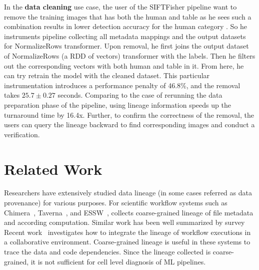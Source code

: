 \documentclass{sig-alternate}
\begin{document}
In the {\bf data cleaning} use case, the user of the SIFTFisher pipeline want to remove the training images that has both the human and table as
he sees such a combination results in lower detection accuracy for the human category .
So he instruments pipeline collecting all metadata mappings and the output datasets for NormalizeRows transformer. 
Upon removal, he first joins the output dataset of NormalizeRows (a RDD of vectors) transformer with the labels.
Then he filters out the corresponding vectors with both human and table in it. 
From here, he can try retrain the model with the cleaned dataset. 
This particular instrumentation introduces a performance penalty of 46.8\%, and the removal takes $25.7\pm0.27$ seconds.
Comparing to the case of rerunning the data preparation phase of the pipeline, using lineage information speeds up the turnaround
time by 16.4x. Further, to confirm the correctness of the removal, the users can query the lineage backward to find corresponding 
images and conduct a verification.

\section{Related Work}
\label{sec:Related}
Researchers have extensively studied data lineage (in some cases referred as data provenance) for various purposes.
For scientific workflow systems such as  Chimera~\cite{foster02}, Taverna~\cite{oinn02}, and ESSW~\cite{frew01}, 
collects coarse-grained lineage of file metadata and according computation. 
Similar work has been well summarized by survey~\cite{simmhan05, freire08, bose05}
Recent work~\cite{altintas10} investigates how to integrate the lineage of workflow executions
in a collaborative environment. Coarse-grained lineage is useful in these systems to trace the data and code dependencies.
Since the lineage collected is coarse-grained, it is not sufficient for cell level diagnosis of ML pipelines.
\end{document}
